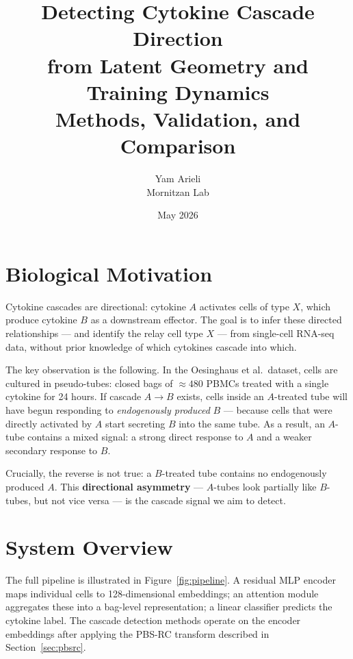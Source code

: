 \documentclass[11pt]{article}
\title{\textbf{Detecting Cytokine Cascade Direction\\
       from Latent Geometry and Training Dynamics}\\[0.5em]
       \large Methods, Validation, and Comparison}
\author{Yam Arieli \\ Mornitzan Lab}
\date{May 2026}
\begin{document}
\maketitle
\tableofcontents
\bigskip

\section{Biological Motivation}

Cytokine cascades are directional: cytokine $A$ activates cells of type $X$, which produce
cytokine $B$ as a downstream effector. The goal is to infer these directed relationships ---
and identify the relay cell type $X$ --- from single-cell RNA-seq data, without prior knowledge
of which cytokines cascade into which.

The key observation is the following. In the Oesinghaus et al.\ dataset, cells are cultured
in pseudo-tubes: closed bags of $\approx\!480$ PBMCs treated with a single cytokine for 24
hours. If cascade $A\!\to\!B$ exists, cells inside an $A$-treated tube will have begun
responding to \emph{endogenously produced} $B$ --- because cells that were directly activated
by $A$ start secreting $B$ into the same tube. As a result, an $A$-tube contains a mixed
signal: a strong direct response to $A$ and a weaker secondary response to $B$.

Crucially, the reverse is not true: a $B$-treated tube contains no endogenously produced $A$.
This \textbf{directional asymmetry} --- $A$-tubes look partially like $B$-tubes, but not
vice versa --- is the cascade signal we aim to detect.

\section{System Overview}

The full pipeline is illustrated in Figure~\ref{fig:pipeline}. A residual MLP encoder
maps individual cells to 128-dimensional embeddings; an attention module aggregates these
into a bag-level representation; a linear classifier predicts the cytokine label. The
cascade detection methods operate on the encoder embeddings after applying the PBS-RC
transform described in Section~\ref{sec:pbsrc}.
\end{document}
